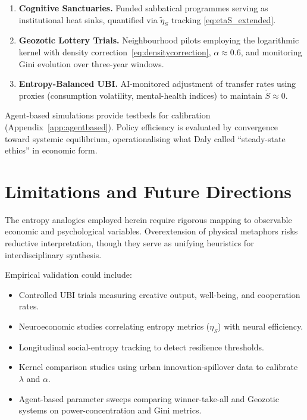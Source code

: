 \documentclass[12pt,a4paper]{article}
\theoremstyle{definition}
\begin{document}
\begin{enumerate}[leftmargin=*]
  \item \textbf{Cognitive Sanctuaries.} Funded sabbatical programmes serving
    as institutional heat sinks, quantified via $\tilde{\eta}_S$ tracking
    \eqref{eq:etaS_extended}.
  \item \textbf{Geozotic Lottery Trials.} Neighbourhood pilots employing the
    logarithmic kernel with density correction~\eqref{eq:densitycorrection},
    $\alpha \approx 0.6$, and monitoring Gini evolution over three-year
    windows.
  \item \textbf{Entropy-Balanced UBI.} AI-monitored adjustment of transfer
    rates using proxies (consumption volatility, mental-health indices) to
    maintain $\dot{S} \approx 0$.
\end{enumerate}

Agent-based simulations provide testbeds for calibration
(Appendix~\ref{app:agentbased}).  Policy efficiency is evaluated by
convergence toward systemic equilibrium, operationalising what Daly called
``steady-state ethics'' in economic form.

\section{Limitations and Future Directions}
\label{sec:limitations}

The entropy analogies employed herein require rigorous mapping to observable
economic and psychological variables.  Overextension of physical metaphors
risks reductive interpretation, though they serve as unifying heuristics for
interdisciplinary synthesis.

Empirical validation could include:

\begin{itemize}[leftmargin=*]
  \item Controlled UBI trials measuring creative output, well-being, and
    cooperation rates.
  \item Neuroeconomic studies correlating entropy metrics ($\eta_S$) with
    neural efficiency.
  \item Longitudinal social-entropy tracking to detect resilience thresholds.
  \item Kernel comparison studies using urban innovation-spillover data to
    calibrate $\lambda$ and $\alpha$.
  \item Agent-based parameter sweeps comparing winner-take-all and Geozotic
    systems on power-concentration and Gini metrics.
\end{itemize}
\end{document}
